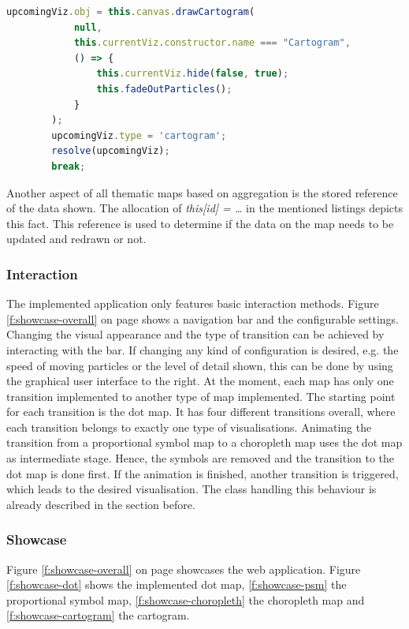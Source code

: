 \begin{description}
\begin{lstlisting}[language=JavaScript, caption={Animate the transition from a dot-map to a cartogram.}, label={lst:tm-dot-cartogram}]
        upcomingViz.obj = this.canvas.drawCartogram(
            null,
            this.currentViz.constructor.name === "Cartogram",
            () => {
                this.currentViz.hide(false, true);
                this.fadeOutParticles();
            }
        );
        upcomingViz.type = 'cartogram';
        resolve(upcomingViz);
        break;
\end{lstlisting}

\end{description}

Another aspect of all thematic maps based on aggregation is the stored reference of the data shown. The allocation of \textit{this[id] = \ldots} in the mentioned listings depicts this fact. This reference is used to determine if the data on the map needs to be updated and redrawn or not.

\subsubsection{Interaction}
The implemented application only features basic interaction methods. Figure \ref{f:showcase-overall} on page \pageref{f:showcase-overall} shows a navigation bar and the configurable settings. Changing the visual appearance and the type of transition can be achieved by interacting with the bar. If changing any kind of configuration is desired, e.g. the speed of moving particles or the level of detail shown, this can be done by using the graphical user interface to the right.
At the moment, each map has only one transition implemented to another type of map implemented. The starting point for each transition is the dot map. It has four different transitions overall, where each transition belongs to exactly one type of visualisations. Animating the transition from a proportional symbol map to a choropleth map uses the dot map as intermediate stage. Hence, the symbols are removed and the transition to the dot map is done first. If the animation is finished, another transition is triggered, which leads to the desired visualisation. The class handling this behaviour is already described in the section before.

\subsubsection{Showcase}
Figure \ref{f:showcase-overall} on page \pageref{f:showcase-overall} showcases the web application. Figure \ref{f:showcase-dot} shows the implemented dot map, \ref{f:showcase-psm} the proportional symbol map, \ref{f:showcase-choropleth} the choropleth map and \ref{f:showcase-cartogram} the cartogram.

